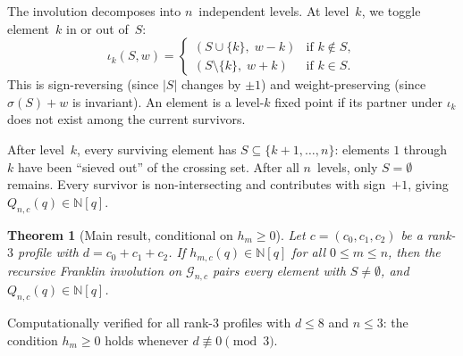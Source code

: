 \documentclass[11pt]{report}
\newcommand{\N}{\mathbb{N}}
\theoremstyle{plain}
\newtheorem{theorem}{Theorem}[chapter]
\theoremstyle{definition}
\begin{document}
The involution decomposes into $n$~independent levels.
At level~$k$, we toggle element~$k$ in or out of~$S$:
\[
  \iota_k(S, w) =
  \begin{cases}
    (S \cup \{k\},\; w - k) & \text{if } k \notin S, \\
    (S \setminus \{k\},\; w + k) & \text{if } k \in S.
  \end{cases}
\]
This is sign-reversing (since $|S|$ changes by $\pm 1$)
and weight-preserving (since $\sigma(S) + w$ is
invariant).  An element is a level-$k$ fixed point if
its partner under $\iota_k$ does not exist among the
current survivors.

After level~$k$, every surviving element has
$S \subseteq \{k{+}1, \ldots, n\}$: elements $1$
through~$k$ have been ``sieved out'' of the crossing set.
After all $n$~levels, only $S = \emptyset$ remains.
Every survivor is non-intersecting and contributes with
sign~$+1$, giving $Q_{n,c}(q) \in \N[q]$.

\begin{theorem}[Main result, conditional on $h_m \geq 0$]
\label{thm:main}
Let $c = (c_0, c_1, c_2)$ be a rank-$3$ profile with
$d = c_0 + c_1 + c_2$.  If $h_{m,c}(q) \in \N[q]$ for
all $0 \leq m \leq n$, then the recursive Franklin
involution on $\mathcal{G}_{n,c}$ pairs every element
with $S \neq \emptyset$, and
$Q_{n,c}(q) \in \N[q]$.
\end{theorem}

Computationally verified for all rank-$3$ profiles with
$d \leq 8$ and $n \leq 3$: the condition $h_m \geq 0$
holds whenever $d \not\equiv 0 \pmod{3}$.




\appendix


\end{document}
